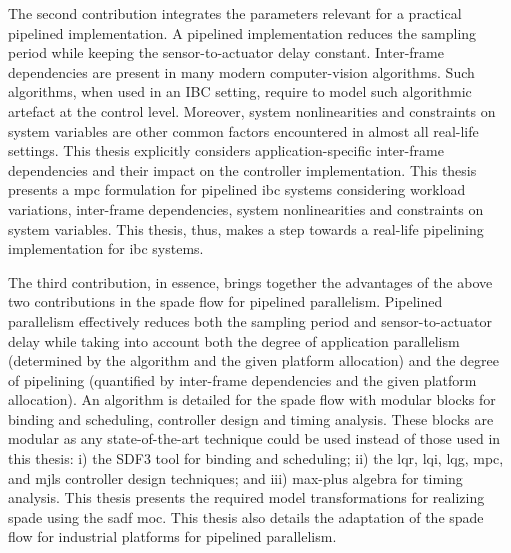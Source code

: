 The second contribution integrates the parameters relevant for a practical pipelined implementation. 
A pipelined implementation reduces the sampling period while keeping the sensor-to-actuator delay constant.
Inter-frame dependencies are present in many modern computer-vision algorithms. Such algorithms, when used in an IBC setting, require to model such algorithmic artefact at the control level. Moreover, system nonlinearities and constraints on system variables are other common factors encountered in almost all real-life settings. This thesis explicitly considers application-specific inter-frame dependencies and their impact on the controller implementation. This thesis presents a \gls{mpc} formulation for pipelined \gls{ibc} systems considering workload variations, inter-frame dependencies, system nonlinearities and constraints on system variables.
This thesis, thus, makes a step towards a real-life pipelining implementation for \gls{ibc} systems.

The third contribution, in essence, brings together the advantages of the above two contributions in the \gls{spade} flow for pipelined parallelism.  Pipelined parallelism effectively reduces both the sampling period and sensor-to-actuator delay while taking into account both the degree of application parallelism (determined by the algorithm and the given platform allocation) and the degree of pipelining (quantified by inter-frame dependencies and the given platform allocation).
An algorithm is detailed for the \gls{spade} flow with modular blocks for binding and scheduling, controller design and timing analysis. These blocks are modular as any state-of-the-art technique could be used instead of those used in this thesis: i) the SDF3 tool for binding and scheduling; ii) the \gls{lqr}, \gls{lqi}, \gls{lqg}, \gls{mpc}, and \gls{mjls} controller design techniques; and iii) max-plus algebra for timing analysis. 
This thesis presents the required model transformations for realizing \gls{spade} using the \gls{sadf} \gls{moc}.
This thesis also details the adaptation of the \gls{spade} flow for industrial platforms for pipelined parallelism.

